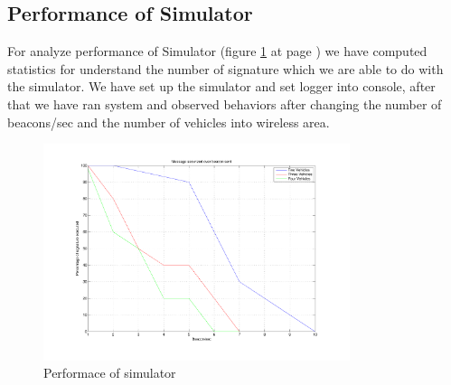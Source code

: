 \subsection{Performance of Simulator}
For analyze performance of Simulator (figure \ref{fig:performance} at page \pageref{fig:performance}) we have computed statistics for understand the number of signature which we are able to do with the simulator. We have set up the \baseline simulator and set logger into console, after that we have ran system and observed behaviors after changing  the number of beacons/sec and the number of vehicles into wireless area.
\begin{figure}[ht]
\centerline{\includegraphics[width=0.8\textwidth]{chart_baseline.pdf}}
\caption{Performace of simulator}
\label{fig:performance}
\end{figure}